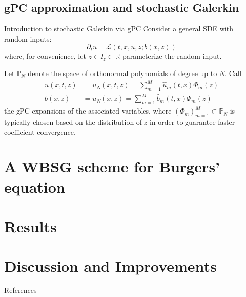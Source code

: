 \documentclass[
    pdf,
    11pt,
    xcolor={svgnames},
  ]{beamer}
\begin{document}
\subsection{gPC approximation and stochastic Galerkin}
\begin{frame}{Introduction to stochastic Galerkin via gPC}
    Consider a general SDE with random inputs:
    \begin{equation} \label{eq:SDE}
        \partial_t u = \mathcal{L}(t,x,u,z;b(x,z))
    \end{equation}
    where, for convenience, let $z \in I_z \subset \mathbb{R}$ parameterize the random input.
    
    \pause
    
    Let $\mathbb{P}_N$ denote the space of orthonormal polynomials of degree up to $N$. Call
    \begin{align*}
        u(x,t,z) &= u_N(x,t,z) = \sum_{m=1}^M \hat{u}_m(t,x) \Phi_m(z) \\
        b(x,z) &= u_N(x,z) = \sum_{m=1}^M \hat{b}_m(t,x) \Phi_m(z) 
    \end{align*}
    the gPC expansions of the associated variables, where $(\Phi_m)_{m=1}^M \subset \mathbb{P}_N$ is typically chosen based on the distribution of $z$ in order to guarantee faster coefficient convergence.
\end{frame}


\section{A WBSG scheme for Burgers' equation}

\section{Results}

\section{Discussion and Improvements}

\begin{frame}{References}
\printbibliography
\end{frame}
\end{document}
